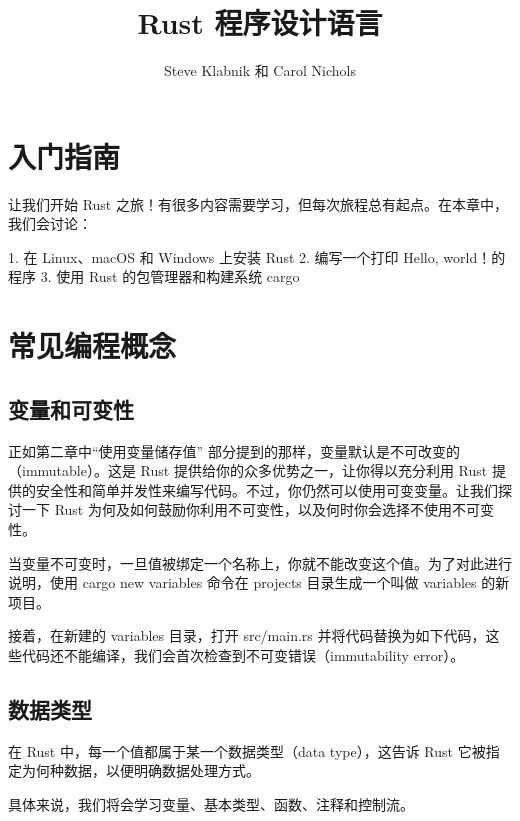 \documentclass[]{article}
\title{Rust 程序设计语言}
\author{Steve Klabnik 和 Carol Nichols}
\begin{document}
\maketitle

\section{入门指南}
	让我们开始 Rust 之旅！有很多内容需要学习，但每次旅程总有起点。在本章中，我们会讨论：
	
	1. 在 Linux、macOS 和 Windows 上安装 Rust
	2. 编写一个打印 Hello, world！的程序
	3. 使用 Rust 的包管理器和构建系统 cargo
\section{常见编程概念}
	\subsection{变量和可变性}
	正如第二章中“使用变量储存值” 部分提到的那样，变量默认是不可改变的（immutable）。这是 Rust 提供给你的众多优势之一，让你得以充分利用 Rust 提供的安全性和简单并发性来编写代码。不过，你仍然可以使用可变变量。让我们探讨一下 Rust 为何及如何鼓励你利用不可变性，以及何时你会选择不使用不可变性。
	
	当变量不可变时，一旦值被绑定一个名称上，你就不能改变这个值。为了对此进行说明，使用 cargo new variables 命令在 projects 目录生成一个叫做 variables 的新项目。

	接着，在新建的 variables 目录，打开 src/main.rs 并将代码替换为如下代码，这些代码还不能编译，我们会首次检查到不可变错误（immutability error）。

	\subsection{数据类型}
	在 Rust 中，每一个值都属于某一个数据类型（data type），这告诉 Rust 它被指定为何种数据，以便明确数据处理方式。
	
具体来说，我们将会学习变量、基本类型、函数、注释和控制流。
\end{document}
